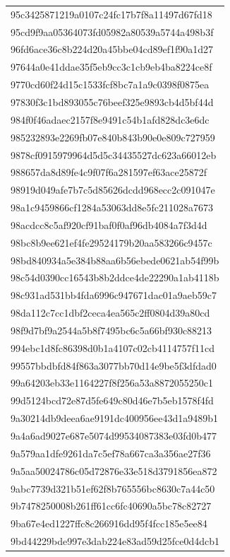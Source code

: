 \begin{tabular}{l}
95c3425871219a0107c24fc17b7f8a11497d67fd18 \\
95cd9f9aa05364073fd05982a80539a5744a498b3f \\
96fd6ace36c8b224d20a45bbe04cd89ef1f90a1d27 \\
97644a0e41ddae35f5eb9cc3c1cb9eb4ba8224ce8f \\
9770cd60f24d15c1533fcf8bc7a1a9c0398f0875ea \\
97830f3c1bd893055c76beef325e9893cb4d5bf44d \\
984f0f46adaec2157f8e9491c54b1afd828dc3e6dc \\
985232893e2269fb07e840b843b90e0e809c727959 \\
9878cf0915979964d5d5c34435527dc623a66012eb \\
988657da8d89fe4c9f07f6a281597ef63ace25872f \\
98919d049afe7b7c5d85626dcdd968ecc2c091047e \\
98a1c9459866cf1284a53063dd8e5fc211028a7673 \\
98acdcc8c5af920cf91baf0f0af96db4084a7f3d4d \\
98bc8b9ee621ef4fe29524179b20aa583266c9457c \\
98bd840934a5e384b88aa6b56ebede0621ab54f99b \\
98c54d0390cc16543b8b2ddce4de22290a1ab4118b \\
98c931ad531bb4fda6996c947671dac01a9aeb59c7 \\
98da112c7cc1dbf2ceca4ea565c2ff0804d39a80cd \\
98f9d7bf9a2544a5b8f7495bc6c5a66bf930c88213 \\
994ebc1d8fc86398d0b1a4107c02cb4114757f11cd \\
99557bbdbfd84f863a3077bb70d14e9be5f3dfdad0 \\
99a64203eb33e1164227f8f256a53a8872055250c1 \\
99d5124bcd72e87d5fe649c80d46e7b5eb1578f4fd \\
9a30214db9deea6ae9191dc400956ee43d1a9489b1 \\
9a4a6ad9027e687e5074d99534087383e03fd0b477 \\
9a579aa1dfe9261da7c5ef78a667ca3a356ae27f36 \\
9a5aa50024786c05d72876e33e518d3791856ea872 \\
9abc7739d321b51ef62f8b765556bc8630c7a44c50 \\
9b7478250008b261ff61cc6fc40690a5bc78c82727 \\
9ba67e4ed1227ffc8c266916dd95f4fcc185e5ee84 \\
9bd44229bde997e3dab224e83ad59d25fce0d4dcb1 \\

\end{tabular}
